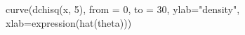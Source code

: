 \begin{Schunk}
\begin{Sinput}
 curve(dchisq(x, 5), from = 0, to = 30, ylab="density", xlab=expression(hat(theta)))
\end{Sinput}
\end{Schunk}
